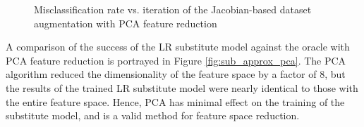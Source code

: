 \begin{figure}
	\centering
	\qquad
	\caption{Misclassification rate vs. iteration of the Jacobian-based dataset augmentation with PCA feature reduction}
\end{figure}

A comparison of the success of the LR substitute model against the oracle with PCA feature reduction is portrayed in Figure \ref{fig:sub_approx_pca}. The PCA algorithm reduced the dimensionality of the feature space by a factor of 8, but the results of the trained LR substitute model were nearly identical to those with the entire feature space. Hence, PCA has minimal effect on the training of the substitute model, and is a valid method for feature space reduction. 


